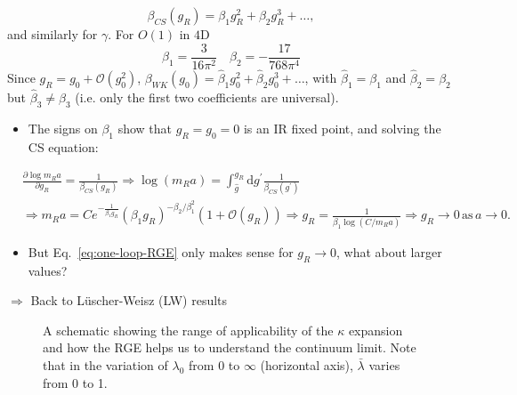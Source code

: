 \begin{equation}
\label{eq:continuum_limit_beta_cs}
    \beta_{CS}(g_R) = \beta_1 g_R^2 + \beta_2 g_R^3 + \ldots,
\end{equation}
and similarly for $\gamma$. For $O(1)$ in $4$D
\begin{equation}
    \beta_1 = \frac{3}{16 \pi^2} \quad \beta_2 = - \frac{17}{768 \pi^4}
\end{equation}
Since $g_R = g_0 + \mathcal{O}(g_0^2)$, $\beta_{WK}(g_0) = \hat{\beta}_1 g_0^2 + \hat{\beta}_2 g_0^3 + \ldots$, with $\hat{\beta}_1 = \beta_1$ and $\hat{\beta}_2 = \beta_2$ but $\hat{\beta}_3 \neq \beta_3$ (i.e. only the first two coefficients are universal).

\begin{itemize}
    \item The signs on $\beta_1$ show that $g_R = g_0 = 0$ is an IR fixed point, and solving the CS equation:
\end{itemize}
\begin{align}
\label{eq:one-loop-RGE}
    &\frac{\partial \log m_R a}{\partial g_R} = \frac{1}{\beta_{CS}(g_R)} \Rightarrow \log(m_R a) = \int_{\hat{g}}^{g_R}\text{d} g^\prime \frac{1}{\beta_{CS}(g^\prime)}\nonumber \\
    &\Rightarrow m_R a = C e^{- \frac{1}{\beta_1 g_R}}(\beta_1 g_R)^{-\beta_2 / \beta_1^2} (1 + \mathcal{O}(g_R)) \Rightarrow g_R = \frac{1}{\beta_1 \log(C/m_R a)} \Rightarrow g_R \rightarrow 0 \, \text{as} \, a \rightarrow 0.
\end{align}

\begin{itemize}
  \item But Eq.~\eqref{eq:one-loop-RGE} only makes sense for $g_R \rightarrow 0$, what about larger values?
\end{itemize}
\(\Rightarrow\) Back to Lüscher-Weisz (LW) results\\
\begin{figure}
    \centering
    \caption{A schematic showing the range of applicability of the $\kappa$ expansion and how the RGE helps us to understand the continuum limit. Note that in the  variation of $\lambda_0$ from 0 to $\infty$ (horizontal axis), $\bar\lambda$ varies from 0 to 1.}
    \label{fig:enter-label}
\end{figure}

